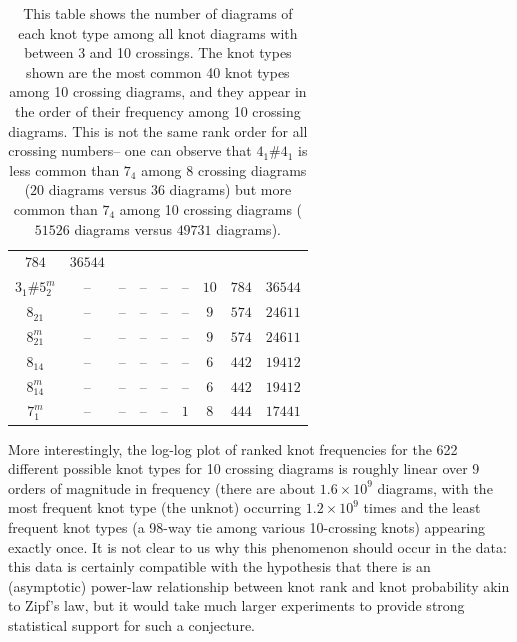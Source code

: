 \documentclass[amsmath,secnumarabic,amssymb,floatfix,nofootinbib,nobibnotes,letterpaper,11pt,tightenlines,showkeys]{revtex4}
\theoremstyle{definition}
\let\mgp=\marginpar \marginparwidth18mm \marginparsep1mm
\def\marginpar#1{\mgp{\raggedright\tiny #1}}
\let\lbl=\label
\def\label#1{\lbl{#1}\ifinner\else\marginpar{\ref{#1} #1}\ignorespaces\fi}
\begin{document}
\begin{table}[H]
\begin{ruledtabular}
\begin{tabular}{ccccccccc}
$\num{784}$ &
$\num{36544}$\\
$3_{1}^{}\#5_{2}^{m}$ &
-- &
-- &
-- &
-- &
-- &
$\num{10}$ &
$\num{784}$ &
$\num{36544}$\\
$8_{21}^{}$ &
-- &
-- &
-- &
-- &
-- &
$\num{9}$ &
$\num{574}$ &
$\num{24611}$\\
$8_{21}^{m}$ &
-- &
-- &
-- &
-- &
-- &
$\num{9}$ &
$\num{574}$ &
$\num{24611}$\\
$8_{14}^{}$ &
-- &
-- &
-- &
-- &
-- &
$\num{6}$ &
$\num{442}$ &
$\num{19412}$\\
$8_{14}^{m}$ &
-- &
-- &
-- &
-- &
-- &
$\num{6}$ &
$\num{442}$ &
$\num{19412}$\\
$7_{1}^{m}$ &
-- &
-- &
-- &
-- &
$\num{1}$ &
$\num{8}$ &
$\num{444}$ &
$\num{17441}$
\end{tabular}
\end{ruledtabular}
\caption{This table shows the number of diagrams of each knot type among all knot diagrams with between 3 and 10 crossings. The knot types shown are the most common 40 knot types among 10 crossing diagrams, and they appear in the order of their frequency among 10 crossing diagrams. This is not the same rank order for all crossing numbers-- one can observe that $4_1 \# 4_1$ is less common than $7_4$ among 8 crossing diagrams ($\num{20}$ diagrams versus $\num{36}$ diagrams) but more common than $7_4$ among 10 crossing diagrams ($\num{51526}$ diagrams versus $\num{49731}$ diagrams).}
\label{tab:knot frequency raw data}
\end{table}


More interestingly, the log-log plot of ranked knot frequencies for the 622 different possible knot types for 10 crossing diagrams is roughly linear over 9 orders of magnitude in frequency (there are about $1.6 \times 10^9$ diagrams, with the most frequent knot type (the unknot) occurring $1.2 \times 10^9$ times and the least frequent knot types (a 98-way tie among various 10-crossing knots) appearing exactly once. It is not clear to us why this phenomenon should occur in the data: this data is certainly compatible with the hypothesis that there is an (asymptotic) power-law relationship between knot rank and knot probability akin to Zipf's law, but it would take much larger experiments to provide strong statistical support for such a conjecture.
\end{document}
